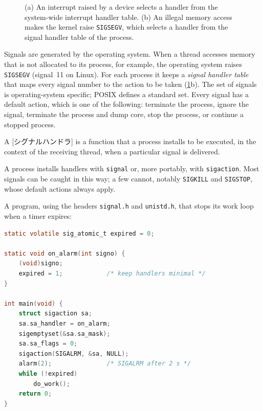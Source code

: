 \documentclass[../main.tex]{subfiles}
\begin{document}
\begin{figure}[htbp]
  \centering
  
  \caption{(a) An interrupt raised by a device selects a handler from the
    system-wide interrupt handler table.  (b) An illegal memory access
    makes the kernel raise \texttt{SIGSEGV}, which selects a handler from
    the signal handler table of the process.}
  \label{fig:l05-int-sig}
\end{figure}

Signals are generated by the operating system.  When a thread accesses
memory that is not allocated to its process, for example, the operating
system raises \texttt{SIGSEGV} (signal~11 on Linux).  For each process it
keeps a \emph{signal handler table} that maps every signal number to the
action to be taken (\cref{fig:l05-int-sig}b).  The set of signals is
operating-system specific; POSIX defines a standard set.  Every signal has
a default action, which is one of the following: terminate the process,
ignore the signal, terminate the process and dump core, stop the process,
or continue a stopped process.

\begin{definition}
  A [シグナルハンドラ] is a function that a process
  installs to be executed, in the context of the receiving thread, when a
  particular signal is delivered.
\end{definition}

A process installs handlers with \texttt{signal} or, more portably, with
\texttt{sigaction}.  Most signals can be caught in this way; a few cannot,
notably \texttt{SIGKILL} and \texttt{SIGSTOP}, whose default actions always
apply.

\begin{example}
  A program, using the headers \texttt{signal.h} and \texttt{unistd.h},
  that stops its work loop when a timer expires:
  \begin{lstlisting}[language=C, numbers=none]
static volatile sig_atomic_t expired = 0;

static void on_alarm(int signo) {
    (void)signo;
    expired = 1;            /* keep handlers minimal */
}

int main(void) {
    struct sigaction sa;
    sa.sa_handler = on_alarm;
    sigemptyset(&sa.sa_mask);
    sa.sa_flags = 0;
    sigaction(SIGALRM, &sa, NULL);
    alarm(2);               /* SIGALRM after 2 s */
    while (!expired)
        do_work();
    return 0;
}
\end{lstlisting}
\end{example}
\end{document}
